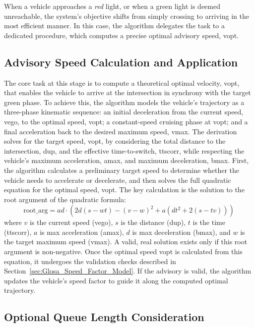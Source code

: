 When a vehicle approaches a \textit{red} light, or when a green light is deemed unreachable, the system's objective shifts from simply crossing to arriving in the most efficient manner. In this case, the algorithm delegates the task to a dedicated procedure, which computes a precise optimal advisory speed, \gls{vopt}.

\subsection{Advisory Speed Calculation and Application}
\label{sec:Glosa_Speed_Adaptation}

The core task at this stage is to compute a theoretical optimal velocity, \gls{vopt}, that enables the vehicle to arrive at the intersection in synchrony with the target green phase. To achieve this, the algorithm models the vehicle's trajectory as a three-phase kinematic sequence: an initial deceleration from the current speed, \gls{vego}, to the optimal speed, \gls{vopt}; a constant-speed cruising phase at \gls{vopt}; and a final acceleration back to the desired maximum speed, \gls{vmax}.
\mynewline
The derivation solves for the target speed, \gls{vopt}, by considering the total distance to the intersection, \gls{dup}, and the effective time-to-switch, \gls{ttscorr}, while respecting the vehicle's maximum acceleration, \gls{amax}, and maximum deceleration, \gls{bmax}. First, the algorithm calculates a preliminary target speed to determine whether the vehicle needs to accelerate or decelerate, and then solves the full quadratic equation for the optimal speed, \gls{vopt}. The key calculation is the solution to the root argument of the quadratic formula:
\begin{equation}
    \mathrm{root\_arg} = ad \cdot \left( 2d(s - wt) - (v-w)^2 + a(dt^2 + 2(s - tv)) \right)
\end{equation}
where $v$ is the current speed (\gls{vego}), $s$ is the distance (\gls{dup}), $t$ is the time (\gls{ttscorr}), $a$ is max acceleration (\gls{amax}), $d$ is max deceleration (\gls{bmax}), and $w$ is the target maximum speed (\gls{vmax}). A valid, real solution exists only if this root argument is non-negative.
\mynewline
Once the optimal speed \gls{vopt} is calculated from this equation, it undergoes the validation checks described in Section~\vref{sec:Glosa_Speed_Factor_Model}. If the advisory is valid, the algorithm updates the vehicle’s speed factor to guide it along the computed optimal trajectory.

\subsection{Optional Queue Length Consideration}
\label{sec:Glosa_Queue_Length}

